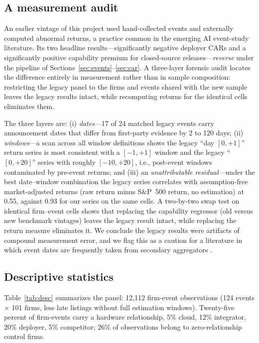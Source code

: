 \documentclass[review,12pt,authoryear]{elsarticle}
\begin{document}
\subsection{A measurement audit}\label{sec:audit}

An earlier vintage of this project used hand-collected events and externally
computed abnormal returns, a practice common in the emerging AI event-study
literature. Its two headline results---significantly negative deployer CARs
and a significantly positive capability premium for closed-source
releases---\emph{reverse} under the pipeline of
Sections~\ref{sec:events}--\ref{sec:car}. A three-layer forensic audit locates
the difference entirely in measurement rather than in sample composition:
restricting the legacy panel to the firms and events shared with the new
sample leaves the legacy results intact, while recomputing returns for the
identical cells eliminates them.

The three layers are: (i) \emph{dates}---17 of 24 matched legacy events carry
announcement dates that differ from first-party evidence by 2 to 120 days;
(ii) \emph{windows}---a scan across all window definitions shows the legacy
``day $[0,+1]$'' return series is most consistent with a $[-1,+1]$ window and
the legacy ``$[0,+20]$'' series with roughly $[-10,+20]$, i.e., post-event
windows contaminated by pre-event returns; and (iii) an \emph{unattributable
residual}---under the best date--window combination the legacy series
correlates with assumption-free market-adjusted returns (raw return minus
S\&P~500 return, no estimation) at 0.55, against 0.93 for our series on the
same cells. A two-by-two swap test on identical firm--event cells shows that
replacing the capability regressor (old versus new benchmark vintages) leaves
the legacy result intact, while replacing the return measure eliminates it.
We conclude the legacy results were artifacts of compound measurement error,
and we flag this as a caution for a literature in which event dates are
frequently taken from secondary aggregators
\citep{simonsohn2020,brodeur2020,mitton2022}.

\subsection{Descriptive statistics}

Table~\ref{tab:desc} summarizes the panel: 12,112 firm-event observations
(124 events $\times$ 101 firms, less late listings without full estimation
windows). Twenty-five percent of firm-events carry a hardware relationship,
5\% cloud, 12\% integrator, 20\% deployer, 5\% competitor; 26\% of
observations belong to zero-relationship control firms.
\end{document}
